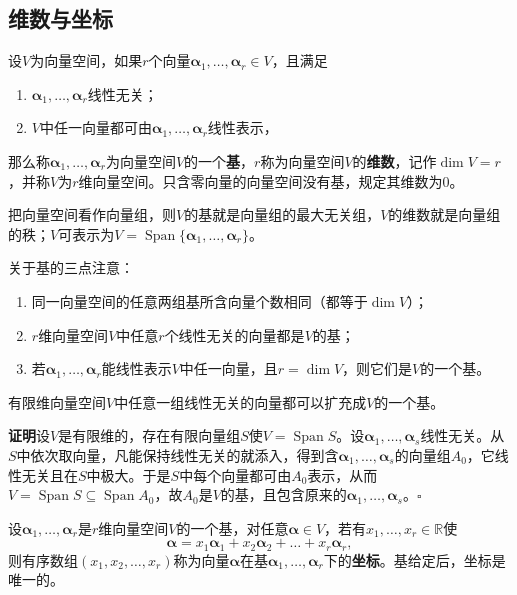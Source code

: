 \subsection{维数与坐标}
\begin{definition}[基与维数]
设$V$为向量空间，如果$r$个向量$\boldsymbol{\alpha}_1,\dots,\boldsymbol{\alpha}_r\in V$，且满足
\begin{enumerate}
    \item[(i)] $\boldsymbol{\alpha}_1,\dots,\boldsymbol{\alpha}_r$线性无关；
    \item[(ii)] $V$中任一向量都可由$\boldsymbol{\alpha}_1,\dots,\boldsymbol{\alpha}_r$线性表示，
\end{enumerate}
那么称$\boldsymbol{\alpha}_1,\dots,\boldsymbol{\alpha}_r$为向量空间$V$的一个\textbf{基}，$r$称为向量空间$V$的\textbf{维数}，记作$\dim V=r$，并称$V$为$r$维向量空间。只含零向量的向量空间没有基，规定其维数为$0$。
\end{definition}

把向量空间看作向量组，则$V$的基就是向量组的最大无关组，$V$的维数就是向量组的秩；$V$可表示为$V=\operatorname{Span}\{\boldsymbol{\alpha}_1,\dots,\boldsymbol{\alpha}_r\}$。

关于基的三点注意：
\begin{enumerate}
    \item 同一向量空间的任意两组基所含向量个数相同（都等于$\dim V$）；
    \item $r$维向量空间$V$中任意$r$个线性无关的向量都是$V$的基；
    \item 若$\boldsymbol{\alpha}_1,\dots,\boldsymbol{\alpha}_r$能线性表示$V$中任一向量，且$r=\dim V$，则它们是$V$的一个基。
\end{enumerate}

\begin{theorem}[基扩充定理]
有限维向量空间$V$中任意一组线性无关的向量都可以扩充成$V$的一个基。
\end{theorem}

\textbf{证明}\quad 设$V$是有限维的，存在有限向量组$S$使$V=\operatorname{Span}S$。设$\boldsymbol{\alpha}_1,\dots,\boldsymbol{\alpha}_s$线性无关。从$S$中依次取向量，凡能保持线性无关的就添入，得到含$\boldsymbol{\alpha}_1,\dots,\boldsymbol{\alpha}_s$的向量组$A_0$，它线性无关且在$S$中极大。于是$S$中每个向量都可由$A_0$表示，从而$V=\operatorname{Span}S\subseteq\operatorname{Span}A_0$，故$A_0$是$V$的基，且包含原来的$\boldsymbol{\alpha}_1,\dots,\boldsymbol{\alpha}_s$。\hfill$\square$

\begin{definition}[坐标]
设$\boldsymbol{\alpha}_1,\dots,\boldsymbol{\alpha}_r$是$r$维向量空间$V$的一个基，对任意$\boldsymbol{\alpha}\in V$，若有$x_1,\dots,x_r\in\mathbb{R}$使
\[
\boldsymbol{\alpha}=x_1\boldsymbol{\alpha}_1+x_2\boldsymbol{\alpha}_2+\dots+x_r\boldsymbol{\alpha}_r,
\]
则有序数组$(x_1,x_2,\dots,x_r)$称为向量$\boldsymbol{\alpha}$在基$\boldsymbol{\alpha}_1,\dots,\boldsymbol{\alpha}_r$下的\textbf{坐标}。基给定后，坐标是唯一的。
\end{definition}

